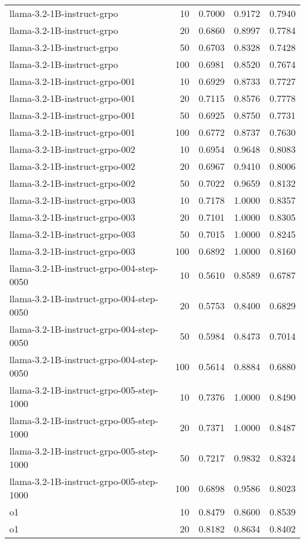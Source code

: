 \begin{tabular}{lrrrr}
llama-3.2-1B-instruct-grpo & 10 & 0.7000 & 0.9172 & 0.7940 \\
llama-3.2-1B-instruct-grpo & 20 & 0.6860 & 0.8997 & 0.7784 \\
llama-3.2-1B-instruct-grpo & 50 & 0.6703 & 0.8328 & 0.7428 \\
llama-3.2-1B-instruct-grpo & 100 & 0.6981 & 0.8520 & 0.7674 \\
llama-3.2-1B-instruct-grpo-001 & 10 & 0.6929 & 0.8733 & 0.7727 \\
llama-3.2-1B-instruct-grpo-001 & 20 & 0.7115 & 0.8576 & 0.7778 \\
llama-3.2-1B-instruct-grpo-001 & 50 & 0.6925 & 0.8750 & 0.7731 \\
llama-3.2-1B-instruct-grpo-001 & 100 & 0.6772 & 0.8737 & 0.7630 \\
llama-3.2-1B-instruct-grpo-002 & 10 & 0.6954 & 0.9648 & 0.8083 \\
llama-3.2-1B-instruct-grpo-002 & 20 & 0.6967 & 0.9410 & 0.8006 \\
llama-3.2-1B-instruct-grpo-002 & 50 & 0.7022 & 0.9659 & 0.8132 \\
llama-3.2-1B-instruct-grpo-003 & 10 & 0.7178 & 1.0000 & 0.8357 \\
llama-3.2-1B-instruct-grpo-003 & 20 & 0.7101 & 1.0000 & 0.8305 \\
llama-3.2-1B-instruct-grpo-003 & 50 & 0.7015 & 1.0000 & 0.8245 \\
llama-3.2-1B-instruct-grpo-003 & 100 & 0.6892 & 1.0000 & 0.8160 \\
llama-3.2-1B-instruct-grpo-004-step-0050 & 10 & 0.5610 & 0.8589 & 0.6787 \\
llama-3.2-1B-instruct-grpo-004-step-0050 & 20 & 0.5753 & 0.8400 & 0.6829 \\
llama-3.2-1B-instruct-grpo-004-step-0050 & 50 & 0.5984 & 0.8473 & 0.7014 \\
llama-3.2-1B-instruct-grpo-004-step-0050 & 100 & 0.5614 & 0.8884 & 0.6880 \\
llama-3.2-1B-instruct-grpo-005-step-1000 & 10 & 0.7376 & 1.0000 & 0.8490 \\
llama-3.2-1B-instruct-grpo-005-step-1000 & 20 & 0.7371 & 1.0000 & 0.8487 \\
llama-3.2-1B-instruct-grpo-005-step-1000 & 50 & 0.7217 & 0.9832 & 0.8324 \\
llama-3.2-1B-instruct-grpo-005-step-1000 & 100 & 0.6898 & 0.9586 & 0.8023 \\
o1 & 10 & 0.8479 & 0.8600 & 0.8539 \\
o1 & 20 & 0.8182 & 0.8634 & 0.8402 \\

\end{tabular}
